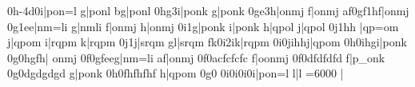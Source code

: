 \notes\ibu0h{-4}\zq d\qh0i|\motif pon{=l}\enotes
\notes\tbsqh g|\motif ponl\enotes
\temps\NOtes\zh b\hu g|\Motif ponl\enotes
\changecontext\serre
\Notes\Ibu0hg3\bsqh i|\motif ponk\enotes
\Notes\tbsqh g|\motif ponk\enotes
\zbarre\Notes\Ibu0ge3\bsqh h|\motif onmj\enotes
\Notes\tbsqh f|\motif onmj\enotes
\zbarre\NOtes\zq a\qu f\sk\Ibu0gf1\bsqh h\tbsqh f|\Motif onmj\enotes
\barre\serre\notes\ibu0g1\bigna e\bsqh e\relax|\motif nm{=l}i\enotes
\notes\bsqh g|\motif nmli\enotes
\notes\bsqh f|\motif onmj\enotes
\notes\tbsqh h|\motif onmj\enotes
\notes\ibu0i1\bsqh g|\motif ponk\enotes
\notes\bsqh i|\motif ponk\enotes
\notes\bsqh h|\motif qpol\enotes
\notes{}\bsqh j|\motif qpol\enotes
%
\changecontext\notes\ibu0j1\bigna h\bsqh h\relax
|\motif qp{=o}m\enotes
\notes\bsqh j|\motif qpom\enotes
\notes\bsqh i|\motif rqpm\enotes
\notes\tbsqh k|\motif rqpm\enotes
\notes\ibu0j1\bsqh j|\motif srqm\enotes
\notes\bigfl g\tbsqh l|\motif srqm\enotes
%
\changecontexte
\NOtes\zq f\qu k\sk\ibu0i2\bsqh i\tbsqh k|\Motif rqpm\enotes
\zbarre\NOtes\ibu0i0\bsqh j\bsqh i\fl h\bsqh h\tbsqh j|\Motif qpom\enotes
%
\barre\NOtes\ibu0h0\bsqh i\bsqh h\bsqh g\tbsqh i|\Motif ponk\enotes
\zbarre\Notes\ibu0g0\bsqh h\bsqh g\bsqh f\tbsqh h|
\Motif onmj\enotes
\barre\Notes\ibu0f0\bsqh g\bsqh f\na e\bsqh e\tbsqh g|\Motif nm{=l}i\enotes
\temps\Notes\zh a\hu f|\Motif onmj\enotes
\barre\Notes\ibu0f0\na a\zq c\bsqh f\zq c\bsqh f\zq c\bsqh f\zq c\tbsqh
f|\na o\Motif onmj\enotes
\temps\Notes\ibu0f0\zq d\bqqh f\zq d\bqqh f\zq d\bqqh f\zq d\tbqqh
f|\Motif p{_o}nk\enotes
\barre\Notes\ibu0g0\zq d\bsqh g\zq d\bsqh g\zq d\bsqh g\zq d\tbsqh
g|\Motif ponk\enotes
\temps\Notes\ibu0h0\zq f\bsqh h\zq f\bsqh h\zq f\bsqh h\zq f\tbsqh
h|\Motif qpom\enotes
\barre\Notes\ibu0g0\relax
{}\qh0i\qh0i\qh0i\tqh0i|\Motif pon{=l}\enotes
\nspace\NOtes\pointdorgue l\hpause|\pointdorgue l\hpause\toctfin\enotes
\suspmorceau\def\everystaff{}\relax
\eject
\relax\cleftoksi={{6}{0}{0}{0}}%
      \eject{}\Interligne\relax
\def\interfacteur{11}%
\def\scalenoteskip{1.0}%
\relax
\generalmeter{\allabreve}\reprmorceau
\savemeters\noteskipLarge\saveclefs
\notes{}|\soupir\enotes
